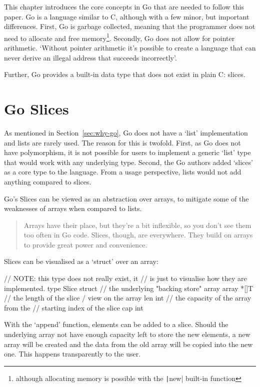 This chapter introduces the core concepts in Go that are needed to follow this paper.
Go is a language similar to C, although with a few minor, but important differences.
First, Go is garbage collected, meaning that the programmer does not need to allocate
and free memory\footnote{although allocating memory is possible with the \texttt|new|
built-in function}. Secondly, Go does not allow for pointer arithmetic.
`Without pointer arithmetic it's possible to create a language that can never derive an
illegal address that succeeds incorrectly'\autocite{go-pointerarithmetic}.

Further, Go provides a built-in data type that does not exist in plain C: slices.

\section{Go Slices}\label{sec:go-slices}

As mentioned in Section~\ref{sec:why-go}, Go does not have a `list' implementation and lists are rarely used.
The reason for this
is twofold. First, as Go does not have polymorphism, it is not possible for users to implement a generic
`list' type that would work with any underlying type. Second, the Go authors added `slices' as a core type
to the language. From a usage perspective, lists would not add anything compared to slices.

Go's Slices can be viewed as an abstraction over arrays, to mitigate some of the weaknesses of arrays
when compared to lists.

\begin{quote}
    Arrays have their place, but they're a bit inflexible, so you don't see them too often in Go code.
    Slices, though, are everywhere. They build on arrays to provide great power and convenience.\autocite{golang-slices}
\end{quote}

Slices can be visualised as a `struct' over an array:

\begin{gocode}
// NOTE: this type does not really exist, it
// is just to visualise how they are implemented.
type Slice struct {
    // the underlying "backing store" array
    array *[]T
    // the length of the slice / view on the array
    len int
    // the capacity of the array from the
    // starting index of the slice
    cap int
}
\end{gocode}

With the `append' function, elements can be added to a slice. Should the underlying array not have enough
capacity left to store the new elements, a new array will be created and the data from the old array will
be copied into the new one. This happens transparently to the user.

